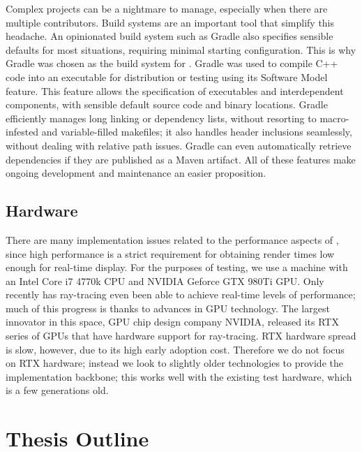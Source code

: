 
Complex projects can be a nightmare to manage, especially when there are multiple contributors.
Build systems are an important tool that simplify this headache.
An opinionated build system such as Gradle also specifies sensible defaults for most situations, requiring minimal starting configuration.
This is why Gradle was chosen as the build system for \name.
Gradle was used to compile C++ code into an executable for distribution or testing using its Software Model feature.
This feature allows the specification of executables and interdependent components, with sensible default source code and binary locations.
Gradle efficiently manages long linking or dependency lists, without resorting to macro-infested and variable-filled makefiles; it also handles header inclusions seamlessly, without dealing with relative path issues.
Gradle can even automatically retrieve dependencies if they are published as a Maven artifact.
All of these features make ongoing development and maintenance an easier proposition.

\subsection{Hardware}
\label{ch:intro:background:hardware}

There are many implementation issues related to the performance aspects of \name, since high performance is a strict requirement for obtaining render times low enough for real-time display.
For the purposes of testing, we use a machine with an Intel Core i7 4770k CPU and NVIDIA Geforce GTX 980Ti GPU.
Only recently has ray-tracing even been able to achieve real-time levels of performance; much of this progress is thanks to advances in GPU technology.
The largest innovator in this space, GPU chip design company NVIDIA, released its RTX series of GPUs that have hardware support for ray-tracing.
RTX hardware spread is slow, however, due to its high early adoption cost.
Therefore we do not focus on RTX hardware; instead we look to slightly older technologies to provide the implementation backbone; this works well with the existing test hardware, which is a few generations old.


\section{Thesis Outline}
\label{ch:intro:outline}

